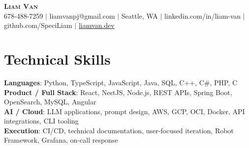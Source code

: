 \documentclass[letterpaper,11pt]{article}
\begin{document}

%
\begin{center}
    \textbf{\Huge \scshape Liam Van} \\ \vspace{1pt}
    \small 678-488-7259 $|$ \small {liamvanpj@gmail.com} $|$ Seattle, WA
 {{$|$ linkedin.com/in/liam-van} {$|$ github.com/SpeciLiam} {$|$ \href{https://liamvan.dev}{liamvan.dev}}}

\end{center}

\section{Technical Skills}
 \begin{itemize}[leftmargin=0.15in, label={}]
    \small{\item{
     \textbf{Languages}{: Python, TypeScript, JavaScript, Java, SQL, C++, C\#, PHP, C} \\
     \textbf{Product / Full Stack}{: React, NestJS, Node.js, REST APIs, Spring Boot, OpenSearch, MySQL, Angular} \\
     \textbf{AI / Cloud}{: LLM applications, prompt design, AWS, GCP, OCI, Docker, API integrations, CLI tooling} \\
     \textbf{Execution}{: CI/CD, technical documentation, user-focused iteration, Robot Framework, Grafana, on-call response} \\
    }}
 \end{itemize}
%

\end{document}
